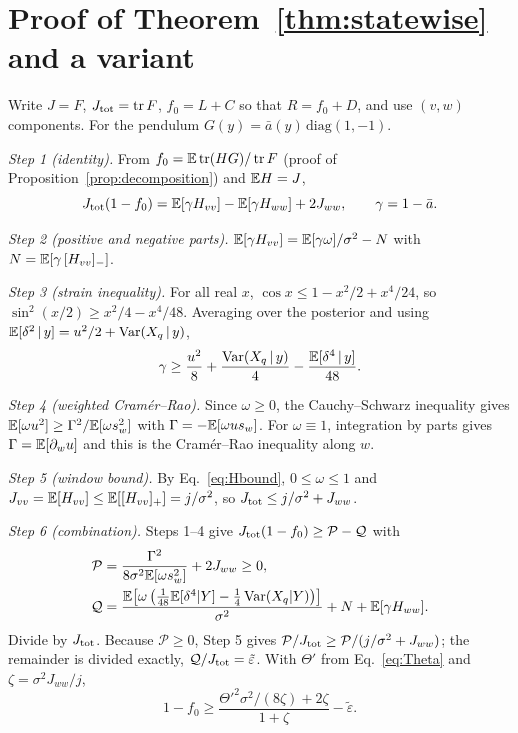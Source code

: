 \section{Proof of Theorem~\ref{thm:statewise} and a variant}
\label{app:bound}

Write $J = F$, $J_{\rm tot} = \operatorname{tr} F$, $f_0 = L + C$ so that $R = f_0 + D$, and use $(v,w)$ components. For the pendulum $G(y) = \bar a(y)\,\mathrm{diag}(1,-1)$.

\emph{Step 1 (identity).} From $f_0 = \mathbb{E}\operatorname{tr}(HG)/\operatorname{tr} F$ (proof of Proposition~\ref{prop:decomposition}) and $\mathbb{E} H = J$,
\begin{equation}
J_{\rm tot}(1 - f_0) = \mathbb{E}[\gamma H_{vv}] - \mathbb{E}[\gamma H_{ww}] + 2J_{ww}, \qquad \gamma = 1 - \bar a .
\label{eq:step1}
\end{equation}

\emph{Step 2 (positive and negative parts).} $\mathbb{E}[\gamma H_{vv}] = \mathbb{E}[\gamma\omega]/\sigma^2 - N$ with $N = \mathbb{E}[\gamma\,[H_{vv}]_-]$.

\emph{Step 3 (strain inequality).} For all real $x$, $\cos x \leq 1 - x^2/2 + x^4/24$, so $\sin^2(x/2) \geq x^2/4 - x^4/48$. Averaging over the posterior and using $\mathbb{E}[\delta^2\,|\,y] = u^2/2 + \operatorname{Var}(X_q\,|\,y)$,
\begin{equation}
\gamma \geq \frac{u^2}{8} + \frac{\operatorname{Var}(X_q\,|\,y)}{4} - \frac{\mathbb{E}[\delta^4\,|\,y]}{48} .
\end{equation}

\emph{Step 4 (weighted Cram\'er--Rao).} Since $\omega \geq 0$, the Cauchy--Schwarz inequality gives $\mathbb{E}[\omega u^2] \geq \Gamma^2/\mathbb{E}[\omega s_w^2]$ with $\Gamma = -\mathbb{E}[\omega u s_w]$. For $\omega \equiv 1$, integration by parts gives $\Gamma = \mathbb{E}[\partial_w u]$ and this is the Cram\'er--Rao inequality along $w$.

\emph{Step 5 (window bound).} By Eq.~\eqref{eq:Hbound}, $0 \leq \omega \leq 1$ and $J_{vv} = \mathbb{E}[H_{vv}] \leq \mathbb{E}[[H_{vv}]_+] = j/\sigma^2$, so $J_{\rm tot} \leq j/\sigma^2 + J_{ww}$.

\emph{Step 6 (combination).} Steps 1--4 give $J_{\rm tot}(1 - f_0) \geq \mathcal P - \mathcal Q$ with
\begin{align*}
\mathcal P &= \frac{\Gamma^2}{8\sigma^2\mathbb{E}[\omega s_w^2]} + 2J_{ww} \geq 0, \\
\mathcal Q &= \frac{\mathbb{E}\!\left[\omega\left(\tfrac{1}{48}\mathbb{E}[\delta^4|Y] - \tfrac14\operatorname{Var}(X_q|Y)\right)\right]}{\sigma^2} + N + \mathbb{E}[\gamma H_{ww}] .
\end{align*}
Divide by $J_{\rm tot}$. Because $\mathcal P \geq 0$, Step 5 gives $\mathcal P/J_{\rm tot} \geq \mathcal P/(j/\sigma^2 + J_{ww})$; the remainder is divided exactly, $\mathcal Q/J_{\rm tot} = \tilde\varepsilon$. With $\Theta'$ from Eq.~\eqref{eq:Theta} and $\zeta = \sigma^2 J_{ww}/j$,
\begin{equation}
1 - f_0 \geq \frac{\Theta'^2\sigma^2/(8\zeta) + 2\zeta}{1 + \zeta} - \tilde\varepsilon .
\end{equation}

